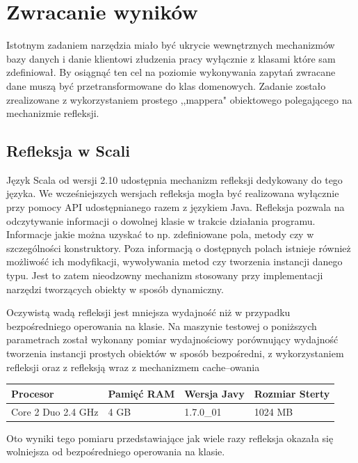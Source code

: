 \documentclass[brudnopis]{xmgr}
\begin{document}
\section{Zwracanie wyników}

Istotnym zadaniem narzędzia miało być ukrycie wewnętrznych mechanizmów bazy danych i danie klientowi złudzenia pracy wyłącznie z klasami które sam zdefiniował. By osiągnąć ten cel na poziomie wykonywania zapytań zwracane dane muszą być przetransformowane do klas domenowych. Zadanie zostało zrealizowane z wykorzystaniem prostego ,,mappera" obiektowego polegającego na mechanizmie refleksji.

\subsection{Refleksja w Scali}

Język Scala od wersji 2.10 udostępnia mechanizm refleksji dedykowany do tego języka. We wcześniejszych wersjach refleksja mogła być realizowana wyłącznie przy pomocy API udostępnianego razem z językiem Java. Refleksja pozwala na odczytywanie informacji o dowolnej klasie w trakcie działania programu. Informacje jakie można uzyskać to np. zdefiniowane pola, metody czy w szczególności konstruktory. Poza informacją o dostępnych polach istnieje również możliwość ich modyfikacji, wywoływania metod czy tworzenia instancji danego typu. Jest to zatem nieodzowny mechanizm stosowany przy implementacji narzędzi tworzących obiekty w sposób dynamiczny.

Oczywistą wadą refleksji jest mniejsza wydajność niż w przypadku bezpośredniego operowania na klasie. Na maszynie testowej o poniższych parametrach został wykonany pomiar wydajnościowy porównujący wydajność tworzenia instancji prostych obiektów w sposób bezpośredni, z wykorzystaniem refleksji oraz z refleksją wraz z mechanizmem cache--owania

\begin{tabular}{|l|l|l|l|}
  \hline 
  \textbf{Procesor} & \textbf{Pamięć RAM} & \textbf{Wersja Javy} & \textbf{Rozmiar Sterty} \\
  \hline
  Core 2 Duo 2.4 GHz & 4 GB & 1.7.0\_01 & 1024 MB \\
  \hline
\end{tabular} 

Oto wyniki tego pomiaru przedstawiające jak wiele razy refleksja okazała się wolniejsza od bezpośredniego operowania na klasie.
\end{document}
